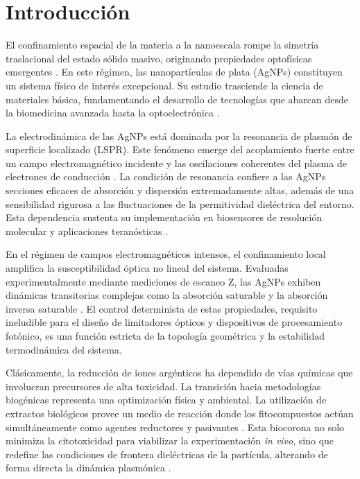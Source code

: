 \section{Introducción}

El confinamiento espacial de la materia a la nanoescala rompe la simetría
traslacional del estado sólido masivo, originando propiedades optofísicas
emergentes \cite{lasmiSilverNanoparticlesAgNPs2025}. En este régimen, las
nanopartículas de plata (AgNPs) constituyen un sistema físico de interés
excepcional. Su estudio trasciende la ciencia de materiales básica,
fundamentando el desarrollo de tecnologías que abarcan desde la biomedicina
avanzada hasta la optoelectrónica \cite{hosnyComprehensiveReviewSilver2025,
satiSilverNanoparticlesAgNPs2025}.

La electrodinámica de las AgNPs está dominada por la resonancia de plasmón de
superficie localizado (LSPR). Este fenómeno emerge del acoplamiento fuerte entre
un campo electromagnético incidente y las oscilaciones coherentes del plasma de
electrones de conducción \cite{lasmiSilverNanoparticlesAgNPs2025}. La
condición de resonancia confiere a las AgNPs secciones eficaces de absorción
y dispersión extremadamente altas, además de una sensibilidad rigurosa a las
fluctuaciones de la permitividad dieléctrica del entorno. Esta dependencia
sustenta su implementación en biosensores de resolución molecular y aplicaciones
teranósticas \cite{chaionSilverNanoparticleBased2025,
satiSilverNanoparticlesAgNPs2025}.

En el régimen de campos electromagnéticos intensos, el confinamiento local
amplifica la susceptibilidad óptica no lineal del sistema. Evaluadas
experimentalmente mediante mediciones de escaneo Z, las AgNPs exhiben
dinámicas transitorias complejas como la absorción saturable y la absorción
inversa saturable \cite{qayyumNonlinearOpticalProperties2025}. El control
determinista de estas propiedades, requisito ineludible para el diseño de
limitadores ópticos y dispositivos de procesamiento fotónico, es una función
estricta de la topología geométrica y la estabilidad termodinámica del sistema.

Clásicamente, la reducción de iones argénticos ha dependido de vías químicas
que involucran precursores de alta toxicidad. La transición hacia metodologías
biogénicas representa una optimización física y ambiental. La utilización de
extractos biológicos provee un medio de reacción donde los fitocompuestos actúan
simultáneamente como agentes reductores y pasivantes
\cite{thomasPlantbasedSynthesisCharacterization2024,
satiSilverNanoparticlesAgNPs2025}. Esta biocorona no solo minimiza la
citotoxicidad para viabilizar la experimentación \textit{in vivo}, sino que
redefine las condiciones de frontera dieléctricas de la partícula, alterando de
forma directa la dinámica plasmónica
\cite{hosnyComprehensiveReviewSilver2025}.

